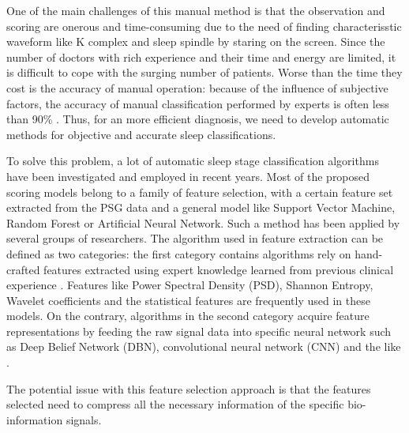 \documentclass[journal]{IEEEtran}
\begin{document}
One of the main challenges of this manual method is that the observation and scoring are onerous and time-consuming due to the need of finding characterisstic waveform like K complex and sleep spindle by staring on the screen.  Since the number of doctors with rich experience and their time and energy are limited, it is difficult to cope with the surging number of patients. Worse than the time they cost is the accuracy of manual operation: because of the influence of subjective factors, the accuracy of manual classification performed by experts is often less than 90\% \cite{norman2000interobserver}. Thus, for an more efficient diagnosis, we need to develop automatic methods for objective and accurate sleep classifications.

To solve this problem, a lot of automatic sleep stage classification algorithms have been investigated and employed in recent years. Most of the proposed scoring models belong to a family of feature selection, with a certain feature set extracted from the PSG data and a general model like Support Vector Machine, Random Forest or Artificial Neural Network. Such a method has been applied by several groups of researchers. The algorithm used in feature extraction can be defined as two categories: the first category contains algorithms rely on hand-crafted features extracted using expert knowledge learned from previous clinical experience \cite{ebrahimi2008automatic,chapotot2010automated,ronzhina2012sleep,dong2017mixed,nakamura2017complexity}. Features like Power Spectral Density (PSD), Shannon Entropy, Wavelet coefficients and the statistical features are frequently used in these models. On the contrary, algorithms in the second category acquire feature representations by feeding the raw signal data into specific neural network such as Deep Belief Network (DBN), convolutional neural network (CNN) and the like \cite{ren2014convolutional,langkvist2012sleep}.

The potential issue with this feature selection approach is that the features selected need to compress all the necessary information of the specific bio-information signals.



%
%
\end{document}
